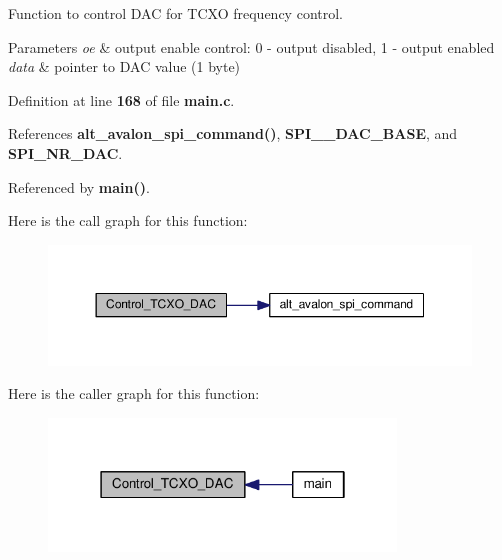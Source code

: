 Function to control D\+AC for T\+C\+XO frequency control. 


\begin{DoxyParams}{Parameters}
{\em oe} & output enable control\+: 0 -\/ output disabled, 1 -\/ output enabled \\
\hline
{\em data} & pointer to D\+AC value (1 byte) \\
\hline
\end{DoxyParams}


Definition at line {\bf 168} of file {\bf main.\+c}.



References {\bf alt\+\_\+avalon\+\_\+spi\+\_\+command()}, {\bf S\+P\+I\+\_\+\_\+\+D\+A\+C\+\_\+\+B\+A\+SE}, and {\bf S\+P\+I\+\_\+\+N\+R\+\_\+\+D\+AC}.



Referenced by {\bf main()}.



Here is the call graph for this function\+:
\nopagebreak
\begin{figure}[H]
\begin{center}
\leavevmode
\includegraphics[width=350pt]{d0/d29/main_8c_a2d5333226b30b5094a668450e8769689_cgraph}
\end{center}
\end{figure}




Here is the caller graph for this function\+:
\nopagebreak
\begin{figure}[H]
\begin{center}
\leavevmode
\includegraphics[width=262pt]{d0/d29/main_8c_a2d5333226b30b5094a668450e8769689_icgraph}
\end{center}
\end{figure}


